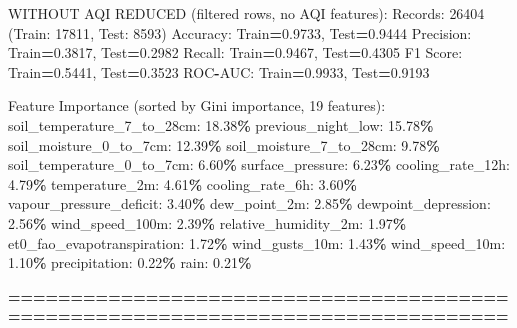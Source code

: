 \documentclass[
  letterpaper,
  DIV=11,
  numbers=noendperiod]{scrartcl}
\newenvironment{Shaded}{\begin{snugshade}}{\end{snugshade}}
\newcommand{\BuiltInTok}[1]{#1}
\newcommand{\DecValTok}[1]{\textcolor[rgb]{0.00,0.00,0.81}{#1}}
\newcommand{\FloatTok}[1]{\textcolor[rgb]{0.00,0.00,0.81}{#1}}
\newcommand{\NormalTok}[1]{#1}
\newcommand{\OperatorTok}[1]{\textcolor[rgb]{0.81,0.36,0.00}{\textbf{#1}}}
\begin{document}
\begin{Shaded}
\begin{Highlighting}[]
\NormalTok{WITHOUT AQI REDUCED (filtered rows, no AQI features):}
\NormalTok{  Records: }\DecValTok{26404}\NormalTok{ (Train: }\DecValTok{17811}\NormalTok{, Test: }\DecValTok{8593}\NormalTok{)}
\NormalTok{  Accuracy: Train}\OperatorTok{=}\FloatTok{0.9733}\NormalTok{, Test}\OperatorTok{=}\FloatTok{0.9444}
\NormalTok{  Precision: Train}\OperatorTok{=}\FloatTok{0.3817}\NormalTok{, Test}\OperatorTok{=}\FloatTok{0.2982}
\NormalTok{  Recall: Train}\OperatorTok{=}\FloatTok{0.9467}\NormalTok{, Test}\OperatorTok{=}\FloatTok{0.4305}
\NormalTok{  F1 Score: Train}\OperatorTok{=}\FloatTok{0.5441}\NormalTok{, Test}\OperatorTok{=}\FloatTok{0.3523}
\NormalTok{  ROC}\OperatorTok{{-}}\NormalTok{AUC: Train}\OperatorTok{=}\FloatTok{0.9933}\NormalTok{, Test}\OperatorTok{=}\FloatTok{0.9193}

\NormalTok{  Feature Importance (}\BuiltInTok{sorted}\NormalTok{ by Gini importance, }\DecValTok{19}\NormalTok{ features):}
\NormalTok{    soil\_temperature\_7\_to\_28cm: }\FloatTok{18.38}\OperatorTok{\%}
\NormalTok{    previous\_night\_low: }\FloatTok{15.78}\OperatorTok{\%}
\NormalTok{    soil\_moisture\_0\_to\_7cm: }\FloatTok{12.39}\OperatorTok{\%}
\NormalTok{    soil\_moisture\_7\_to\_28cm: }\FloatTok{9.78}\OperatorTok{\%}
\NormalTok{    soil\_temperature\_0\_to\_7cm: }\FloatTok{6.60}\OperatorTok{\%}
\NormalTok{    surface\_pressure: }\FloatTok{6.23}\OperatorTok{\%}
\NormalTok{    cooling\_rate\_12h: }\FloatTok{4.79}\OperatorTok{\%}
\NormalTok{    temperature\_2m: }\FloatTok{4.61}\OperatorTok{\%}
\NormalTok{    cooling\_rate\_6h: }\FloatTok{3.60}\OperatorTok{\%}
\NormalTok{    vapour\_pressure\_deficit: }\FloatTok{3.40}\OperatorTok{\%}
\NormalTok{    dew\_point\_2m: }\FloatTok{2.85}\OperatorTok{\%}
\NormalTok{    dewpoint\_depression: }\FloatTok{2.56}\OperatorTok{\%}
\NormalTok{    wind\_speed\_100m: }\FloatTok{2.39}\OperatorTok{\%}
\NormalTok{    relative\_humidity\_2m: }\FloatTok{1.97}\OperatorTok{\%}
\NormalTok{    et0\_fao\_evapotranspiration: }\FloatTok{1.72}\OperatorTok{\%}
\NormalTok{    wind\_gusts\_10m: }\FloatTok{1.43}\OperatorTok{\%}
\NormalTok{    wind\_speed\_10m: }\FloatTok{1.10}\OperatorTok{\%}
\NormalTok{    precipitation: }\FloatTok{0.22}\OperatorTok{\%}
\NormalTok{    rain: }\FloatTok{0.21}\OperatorTok{\%}

\OperatorTok{================================================================================}


\end{Highlighting}
\end{Shaded}
\end{document}
